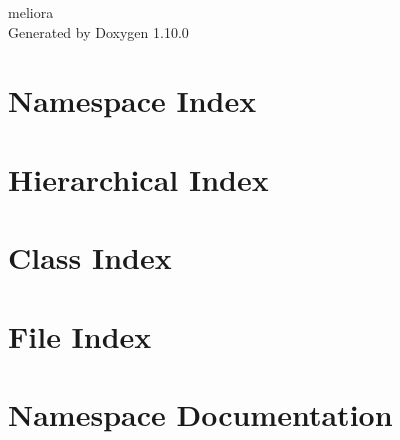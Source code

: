 \documentclass[twoside]{book}
\newcommand{\+}{\discretionary{\mbox{\scriptsize$\hookleftarrow$}}{}{}}
\newcommand{\clearemptydoublepage}{%
    \newpage{\pagestyle{empty}\cleardoublepage}%
  }
\begin{document}
  \raggedbottom
    \hypersetup{pageanchor=false,
                bookmarksnumbered=true,
                pdfencoding=unicode
               }
  \begin{titlepage}
  \vspace*{7cm}
  \begin{center}%
  {\Large meliora}\\
  \vspace*{1cm}
  {\large Generated by Doxygen 1.10.0}\\
  \end{center}
  \end{titlepage}
  \clearemptydoublepage
  \tableofcontents
  \clearemptydoublepage
  \hypersetup{pageanchor=true}

\chapter{Namespace Index}

\chapter{Hierarchical Index}

\chapter{Class Index}

\chapter{File Index}

\chapter{Namespace Documentation}




















\end{document}
